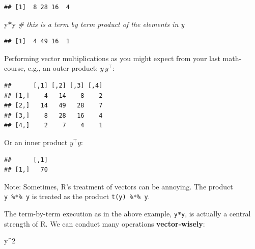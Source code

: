 \documentclass[]{book}
\newenvironment{Shaded}{\begin{snugshade}}{\end{snugshade}}
\newcommand{\CommentTok}[1]{\textcolor[rgb]{0.56,0.35,0.01}{\textit{#1}}}
\newcommand{\DecValTok}[1]{\textcolor[rgb]{0.00,0.00,0.81}{#1}}
\newcommand{\KeywordTok}[1]{\textcolor[rgb]{0.13,0.29,0.53}{\textbf{#1}}}
\newcommand{\NormalTok}[1]{#1}
\newcommand{\OperatorTok}[1]{\textcolor[rgb]{0.81,0.36,0.00}{\textbf{#1}}}
\newcommand{\StringTok}[1]{\textcolor[rgb]{0.31,0.60,0.02}{#1}}
\theoremstyle{definition}
\theoremstyle{definition}
\theoremstyle{definition}
\theoremstyle{remark}
\begin{document}
\begin{verbatim}
## [1]  8 28 16  4
\end{verbatim}

\begin{Shaded}
\begin{Highlighting}[]
\NormalTok{y}\OperatorTok{*}\NormalTok{y }\CommentTok{# this is a term by term product of the elements in y}
\end{Highlighting}
\end{Shaded}

\begin{verbatim}
## [1]  4 49 16  1
\end{verbatim}

Performing vector multiplications as you might expect from your last math-course, e.g., an outer product: \(y\,y^\top\):

\begin{Shaded}
\end{Shaded}

\begin{verbatim}
##      [,1] [,2] [,3] [,4]
## [1,]    4   14    8    2
## [2,]   14   49   28    7
## [3,]    8   28   16    4
## [4,]    2    7    4    1
\end{verbatim}

Or an inner product \(y^\top y\):

\begin{Shaded}
\end{Shaded}

\begin{verbatim}
##      [,1]
## [1,]   70
\end{verbatim}

Note: Sometimes, R's treatment of vectors can be annoying. The product \texttt{y\ \%*\%\ y} is treated as the product \texttt{t(y)\ \%*\%\ y}.

The term-by-term execution as in the above example, \texttt{y*y}, is actually a central strength of R. We can conduct many operations \textbf{vector-wisely}:

\begin{Shaded}
\begin{Highlighting}[]
\NormalTok{y}\OperatorTok{^}\DecValTok{2}
\end{Highlighting}
\end{Shaded}
\end{document}

